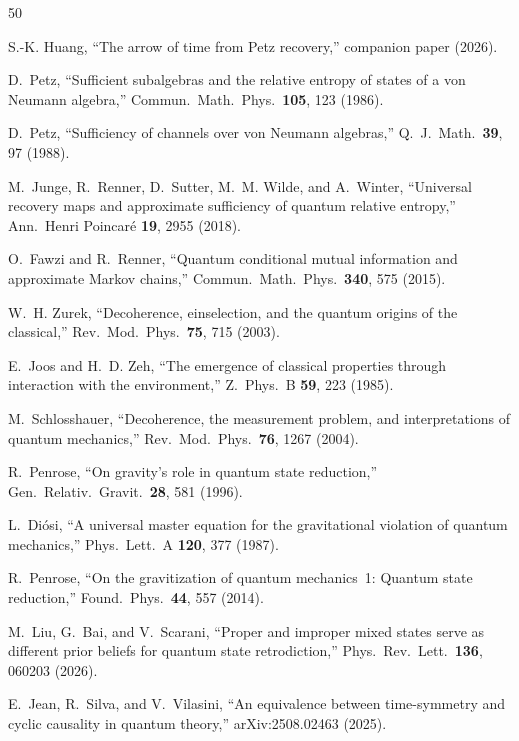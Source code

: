 \documentclass[prl,twocolumn,superscriptaddress,longbibliography,floatfix]{revtex4-2}
\begin{document}
\begin{thebibliography}{50}

S.-K. Huang,
``The arrow of time from Petz recovery,''
companion paper (2026).

D.~Petz,
``Sufficient subalgebras and the relative entropy of states of a
von Neumann algebra,''
Commun.\ Math.\ Phys.\ \textbf{105}, 123 (1986).

D.~Petz,
``Sufficiency of channels over von Neumann algebras,''
Q.\ J.\ Math.\ \textbf{39}, 97 (1988).

M.~Junge, R.~Renner, D.~Sutter, M.~M. Wilde, and A.~Winter,
``Universal recovery maps and approximate sufficiency of quantum
relative entropy,''
Ann.\ Henri Poincar\'{e} \textbf{19}, 2955 (2018).

O.~Fawzi and R.~Renner,
``Quantum conditional mutual information and approximate Markov
chains,''
Commun.\ Math.\ Phys.\ \textbf{340}, 575 (2015).

W.~H. Zurek,
``Decoherence, einselection, and the quantum origins of the
classical,''
Rev.\ Mod.\ Phys.\ \textbf{75}, 715 (2003).

E.~Joos and H.~D. Zeh,
``The emergence of classical properties through interaction with
the environment,''
Z.\ Phys.\ B \textbf{59}, 223 (1985).

M.~Schlosshauer,
``Decoherence, the measurement problem, and interpretations of
quantum mechanics,''
Rev.\ Mod.\ Phys.\ \textbf{76}, 1267 (2004).

R.~Penrose,
``On gravity's role in quantum state reduction,''
Gen.\ Relativ.\ Gravit.\ \textbf{28}, 581 (1996).

L.~Di\'{o}si,
``A universal master equation for the gravitational violation of
quantum mechanics,''
Phys.\ Lett.\ A \textbf{120}, 377 (1987).

R.~Penrose,
``On the gravitization of quantum mechanics~1: Quantum state
reduction,''
Found.\ Phys.\ \textbf{44}, 557 (2014).

M.~Liu, G.~Bai, and V.~Scarani,
``Proper and improper mixed states serve as different prior beliefs
for quantum state retrodiction,''
Phys.\ Rev.\ Lett.\ \textbf{136}, 060203 (2026).

E.~Jean, R.~Silva, and V.~Vilasini,
``An equivalence between time-symmetry and cyclic causality in
quantum theory,''
arXiv:2508.02463 (2025).


\end{thebibliography}
\end{document}

